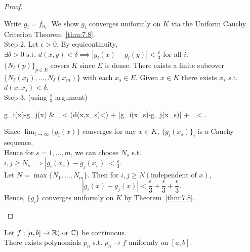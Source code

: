\begin{thm}[25]
\begin{proof}
\begin{enumerate}
			      Write $g_{i}=f_{n_i}$. We show $g_i$ converges uniformly on $K$ via the Uniform Cauchy Criterion Theorem~\ref{thm:7.8}.\\
			      Step 2. Let $\epsilon>0$. By equicontinuity, $\exists{\delta > 0} \text{ s.t. } d(x,y) < \delta \implies \left|g_{i}(x)-g_{i}(y)\right|<\frac{\epsilon}{3}$ for all $i$.\\
			      $\{ {N}_{\delta}(p)\}_{p \in E}$ covers $K$ since $E$ is dense.
			      There exists a finite subcover $\{N_{\delta}(x_1),\ldots ,N_{\delta}(x_{m})\}$ with each $x_s \in E$. Given $x \in K$ there exists $x_s$ s.t. $d(x,x_s)<\delta$.\\
			      Step 3. (using $\frac{\epsilon}{3}$ argument)\\
			      \begin{flalign*}
				      g_{i}(x)-g_{j}(x) & \le {}_{< \;\; (\because d(x,x_s)<\delta)} + \left|g_{i}(x_s)-g_{j}(x_s)\right| + _{<}
				      .\end{flalign*}

			      Since $\lim_{i\to \infty}{\{g_{i}(x)\}}$ converges for any $x \in K$, $\{g_{i}(x_s)\}_i$ is a Cauchy sequence.\\
			      Hence for $s=1,\ldots ,m$, we can choose $N_s$ s.t. $ i,j\ge N_{s}\implies \left|g_{i}(x_{s})-g_{j}(x_{s})\right| <\frac{\epsilon}{3}$.\\
			      Let $N= \max\{N_1,\ldots ,N_m\}$. Then for $i,j\ge N (\text{independent of }x)$,
			      \[
				      \left|g_i(x)-g_j(x)\right|<\frac{\epsilon}{3}+\frac{\epsilon}{3}+\frac{\epsilon}{3}
				      .\]
			      Hence, $\{g_{i}\}$ converges uniformly on $K$ by Theorem~\ref{thm:7.8}.
		\end{enumerate}
	\end{proof}
\end{thm}


\begin{thm}
	Let $f: [a,b]\to \mathbb{R} (\text{ or } \mathbb{C})$ be continuous.\\
	There exists polynomials $p_{n}$ s.t. $p_{n}\to f$ uniformly on $[a,b]$.
\end{thm}

